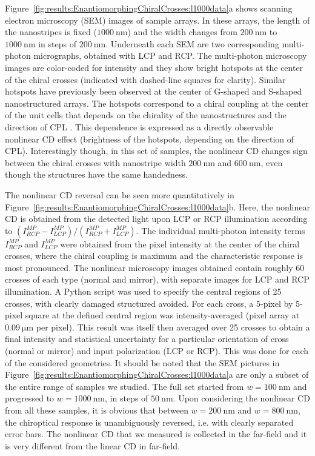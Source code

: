 Figure~\ref{fig:results:EnantiomorphingChiralCrosses:l1000data}a shows scanning electron microscopy (SEM) images of sample arrays. In these arrays, the length of the nanostripes is fixed ($\SI{1000}{\nano\m}$) and the width changes from $\SI{200}{\nano\m}$ to $\SI{1000}{\nano\m}$ in steps of $\SI{200}{\nano\m}$. Underneath each SEM are two corresponding multi-photon micrographs, obtained with LCP and RCP. The multi-photon microscopy images are color-coded for intensity and they show bright hotspots at the center of the chiral crosses (indicated with dashed-line squares for clarity). 
Similar hotspots have previously been observed at the center of G-shaped \cite{Valev2009a} and S-shaped \cite{Valev2014} nanostructured arrays. 
The hotspots correspond to a chiral coupling at the center of the unit cells that depends on the chirality of the nanostructures and the direction of CPL \cite{ Valev2014, Petralli-Mallow1993, Byers1994}. This dependence is expressed as a directly observable nonlinear CD effect (brightness of the hotspots, depending on the direction of CPL). Interestingly though, in this set of samples, the nonlinear CD changes sign between the chiral crosses with nanostripe width  $\SI{200}{\nano\m}$ and $\SI{600}{\nano\m}$, even though the structures have the same handedness.

The nonlinear CD reversal can be seen more quantitatively in Figure~\ref{fig:results:EnantiomorphingChiralCrosses:l1000data}b. Here, the nonlinear CD is obtained from the detected light upon LCP or RCP illumination according to 
$(I_{RCP}^{MP}-I_{LCP}^{MP})/(I_{RCP}^{MP}+I_{LCP}^{MP})$. The individual multi-photon intensity terms $I_{RCP}^{MP}$ and $I_{LCP}^{MP}$ were obtained from the pixel intensity at the center of the chiral crosses, where the chiral coupling is maximum and the characteristic response is most pronounced. 
The nonlinear microscopy images obtained contain roughly 60 crosses of each type (normal and mirror), with separate images for LCP and RCP illumination. A Python script was used to specify the central regions of 25 crosses, with clearly damaged structured avoided. For each cross, a 5-pixel by 5-pixel square at the defined central region was intensity-averaged (pixel array at $\SI{0.09}{\micro\m}$ per pixel). This result was itself then averaged over 25 crosses to obtain a final intensity and statistical uncertainty for a particular orientation of cross (normal or mirror) and input polarization (LCP or RCP). This was done for each of the considered geometries. 
It should be noted that the SEM pictures in Figure~\ref{fig:results:EnantiomorphingChiralCrosses:l1000data}a are only a subset of the entire range of samples we studied. The full set started from $w= \SI{100}{\nano\m}$ and progressed to $w=\SI{1000}{\nano\m}$, in steps of $\SI{50}{\nano\m}$. 
Upon considering the nonlinear CD from all these samples, it is obvious that between $w=\SI{200}{\nano\m}$ and $w=\SI{800}{\nano\m}$, the chiroptical response is unambiguously reversed, i.e. with clearly separated error bars. The nonlinear CD that we measured is collected in the far-field and it is very different from the linear CD in far-field. 

